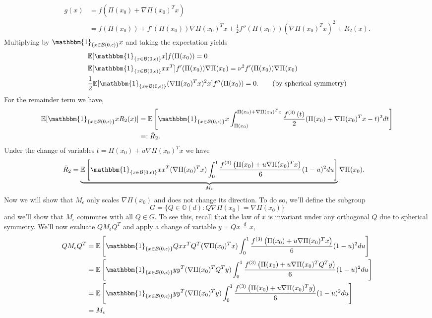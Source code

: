 \documentclass[11pt]{article}
\begin{document}
\begin{align*}
    g(x) &= f\left(\Pi(x_0) + \nabla\Pi(x_0)^Tx\right) \\
    &= f(\Pi(x_0)) + f'(\Pi(x_0))\nabla\Pi(x_0)^Tx + \frac{1}{2}f''(\Pi(x_0))(\nabla\Pi(x_0)^Tx)^2 + R_2(x).
\end{align*}
Multiplying by $\mathbbm{1}_{\{x \in \mathcal{B}(0, \epsilon)\}}x$ and taking the expectation yields
\begin{align*}
    &\mathbb{E}[\mathbbm{1}_{\{x \in \mathcal{B}(0, \epsilon)\}}x]f(\Pi(x_0)) = 0 \\
    &\mathbb{E}[\mathbbm{1}_{\{x \in \mathcal{B}(0, \epsilon)\}}xx^T]f'(\Pi(x_0))\nabla\Pi(x_0) = \nu^2f'(\Pi(x_0))\nabla\Pi(x_0) \\
    & \frac{1}{2}\mathbb{E}[\mathbbm{1}_{\{x \in \mathcal{B}(0, \epsilon)\}}(\nabla \Pi(x_0)^Tx)^2x]f''(\Pi(x_0)) = 0. \tag{by spherical symmetry}
\end{align*}
For the remainder term we have,
\begin{align*}
    \mathbb{E}[\mathbbm{1}_{\{x \in \mathcal{B}(0, \epsilon)\}}xR_2(x)] &= \mathbb{E}\left[\mathbbm{1}_{\{x \in \mathcal{B}(0, \epsilon)\}}x\int_{\Pi(x_0)}^{\Pi(x_0) + \nabla \Pi(x_0)^Tx}\frac{f^{(3)}\left(t\right)}{2}(\Pi(x_0) + \nabla \Pi(x_0)^Tx - t)^2dt\right] \\
    &=: \bar R_2.
\end{align*}
Under the change of variables $t = \Pi(x_0) + u\nabla\Pi(x_0)^Tx$ we have
\begin{align*}
    \bar{R}_2 &= \underbrace{\mathbb{E}\left[\mathbbm{1}_{\{x \in \mathcal{B}(0, \epsilon)\}}xx^T(\nabla \Pi(x_0)^Tx)\int_{0}^{1}\frac{f^{(3)}\left(\Pi(x_0) + u\nabla\Pi(x_0)^Tx\right)}{6}(1-u)^2du\right]}_{M_{\epsilon}}\nabla \Pi(x_0).
\end{align*}
Now we will show that $M_{\epsilon}$ only scales $\nabla\Pi(x_0)$ and does not change its direction. To do so, we'll define the subgroup
\[G = \{Q \in \mathbb{O}(d) : Q\nabla\Pi(x_0) = \nabla\Pi(x_0)\}\]
and we'll show that $M_\epsilon$ commutes with all $Q \in G$. To see this, recall that the law of $x$ is invariant under any orthogonal $Q$ due to spherical symmetry. We'll now evaluate $QM_\epsilon Q^T$ and apply a change of variable $y = Qx \overset{d}= x$,
\begin{align*}
    QM_\epsilon Q^T &= \mathbb{E}\left[\mathbbm{1}_{\{x \in \mathcal{B}(0, \epsilon)\}}Qxx^TQ^T(\nabla \Pi(x_0)^Tx)\int_{0}^{1}\frac{f^{(3)}\left(\Pi(x_0) + u\nabla\Pi(x_0)^Tx\right)}{6}(1-u)^2du\right] \\
    &= \mathbb{E}\left[\mathbbm{1}_{\{x \in \mathcal{B}(0, \epsilon)\}}yy^T(\nabla \Pi(x_0)^TQ^Ty)\int_{0}^{1}\frac{f^{(3)}\left(\Pi(x_0) + u\nabla\Pi(x_0)^TQ^Ty\right)}{6}(1-u)^2du\right] \\
    &= \mathbb{E}\left[\mathbbm{1}_{\{x \in \mathcal{B}(0, \epsilon)\}}yy^T(\nabla \Pi(x_0)^Ty)\int_{0}^{1}\frac{f^{(3)}\left(\Pi(x_0) + u\nabla\Pi(x_0)^Ty\right)}{6}(1-u)^2du\right] \\
    &= M_\epsilon
\end{align*}
\end{document}
